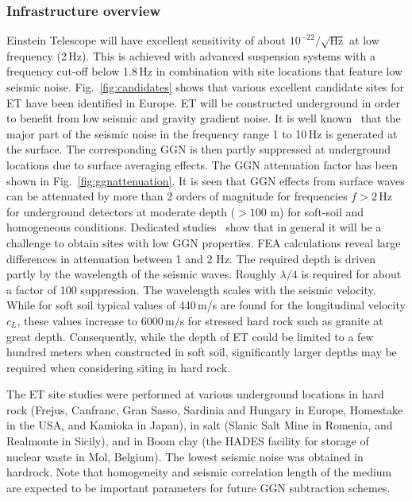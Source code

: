 \subsubsection{Infrastructure overview}
Einstein Telescope will have excellent sensitivity of about $10^{-22}/\sqrt{\mathrm{Hz}}$ at low frequency (2\,Hz). This is achieved with advanced suspension systems with a frequency cut-off below 1.8\,Hz in combination with site locations that feature low seismic noise. Fig.~\ref{fig:candidates} shows that various excellent candidate sites for ET have been identified in Europe. ET will be constructed underground in order to benefit from low seismic and gravity gradient noise. It is well known~\cite{xx} that the major part of the seismic noise in the frequency range 1 to 10\,Hz is generated at the surface. The corresponding GGN is then partly suppressed at underground locations due to surface averaging effects. The GGN attenuation factor has been shown in Fig.~\ref{fig:ggnattenuation}. It is seen that GGN effects from surface waves can be attenuated by more than 2 orders of magnitude for frequencies $f > 2$\,Hz for underground detectors at moderate depth ($>100$ m) for soft-soil and homogeneous conditions. Dedicated studies~\cite{cellaggn} show that in general it will be a challenge to obtain sites with low GGN properties. FEA calculations reveal large differences in attenuation between 1 and 2 Hz. The required depth is driven partly by the wavelength of the seismic waves. Roughly $\lambda / 4$ is required for about a factor of 100 suppression. The wavelength scales with the seismic velocity. While for soft soil typical values of 440\,m/s are found for the longitudinal velocity $c_L$, these values increase to 6000\,m/s for stressed hard rock such as granite at great depth. Consequently, while the depth of ET could be limited to a few hundred meters when constructed in soft soil, significantly larger depths may be required when considering siting in hard rock. 

The ET site studies were performed at various underground locations in hard rock (Frejus, Canfranc, Gran Sasso, Sardinia and Hungary in Europe, Homestake in the USA, and Kamioka in Japan), in salt (Slanic Salt Mine in Romenia, and Realmonte in Sicily), and in Boom clay (the HADES facility for storage of nuclear waste in Mol, Belgium). The lowest seismic noise was obtained in hardrock. Note that homogeneity and seismic correlation length of the medium are expected to be important parameters for future GGN subtraction schemes.

